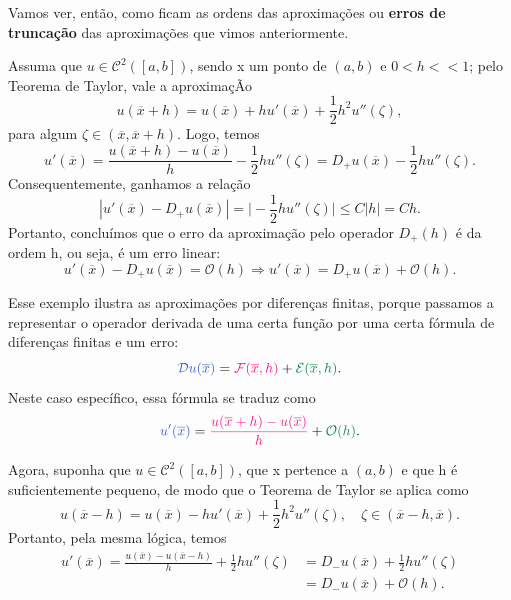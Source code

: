 \documentclass[../differential_methods.tex]{subfiles}
\begin{document}
Vamos ver, então, como ficam as ordens das aproximações ou \textbf{erros de truncação} das aproximações que vimos anteriormente.
\begin{example}[Operador \(D_{+}\)]
	Assuma que \(u\in \mathcal{C}^{2}([a, b])\), sendo x um ponto de \((a, b)\) e \(0<h<<1\); pelo Teorema de Taylor, vale a aproximaçÃo
	\[
		u(\overline{x}+h) = u(\overline{x})+hu'(\overline{x})+\frac{1}{2}h^{2}u''(\zeta ),
	\]
	para algum \( \zeta \in (\overline{x}, \overline{x}+h)\). Logo, temos
	\[
		u'(\overline{x})=\frac{u(\overline{x}+h)-u(\overline{x})}{h} - \frac{1}{2}hu''(\zeta ) = D_{+}u(\overline{x}) - \frac{1}{2}hu''(\zeta ).
	\]
	Consequentemente, ganhamos a relação
	\[
		| u'(\overline{x})-D_{+}u(\overline{x}) | =  \biggl\vert -\frac{1}{2}hu''(\zeta ) \biggr\vert\leq C| h | = Ch.
	\]
	Portanto, concluímos que o erro da aproximação pelo operador \(D_{+}(h)\) é da ordem h, ou seja, é um erro linear:
	\[
		u'(\overline{x})-D_{+}u(\overline{x})=\mathcal{O}(h) \Rightarrow u'(\overline{x})=D_{+}u(\overline{x})+\mathcal{O}(h).
	\]

	Esse exemplo ilustra as aproximações por diferenças finitas, porque passamos a representar o {\color{RoyalBlue3}operador derivada} de uma certa função por uma certa {\color{DeepPink2}fórmula de diferenças finitas} e um {\color{SpringGreen4} erro}:
	\[
		{\color{RoyalBlue3} \mathcal{D}u(\overline{x})} = {\color{DeepPink2}\mathcal{F}(\overline{x}, h)} + {\color{SpringGreen4}\mathcal{E}(\overline{x}, h)}.
	\]
	Neste caso específico, essa fórmula se traduz como
	\[
		{\color{RoyalBlue3} u'(\overline{x})} = {\color{DeepPink2}\frac{u(\overline{x}+h)-u(\overline{x})}{h}} + {\color{SpringGreen4}\mathcal{O}(h)}.
	\]
\end{example}
\begin{example}[Operador \(D_{-}\)]
	Agora, suponha que \(u\in \mathcal{C}^{2}([a, b])\), que x pertence a \((a, b)\) e que h é suficientemente pequeno, de modo que o Teorema de Taylor se aplica como
	\[
		u(\overline{x}-h) = u(\overline{x})-hu'(\overline{x})+\frac{1}{2}h^{2}u''(\zeta ), \quad \zeta \in (\overline{x}-h, \overline{x}).
	\]
	Portanto, pela mesma lógica, temos
	\begin{align*}
		u'(\overline{x})=\frac{u(\overline{x})-u(\overline{x}-h)}{h}+\frac{1}{2}hu''(\zeta ) & = D_{-}u(\overline{x})+\frac{1}{2}hu''(\zeta ) \\
		                                                                                     & = D_{-}u(\overline{x})+\mathcal{O}(h).
	\end{align*}
\end{example}
\end{document}
